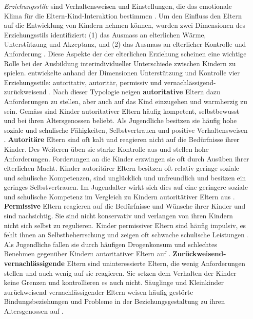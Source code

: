 \textit{Erziehungsstile} sind Verhaltensweisen und Einstellungen, die das emotionale Klima für die Eltern-Kind-Interaktion bestimmen \cite[S.~649]{Siegler2008}. Um den Einfluss den Eltern auf die Entwicklung von Kindern nehmen können, wurden zwei Dimensionen des Erziehungsstils identifiziert: (1) das Ausmass an elterlichen Wärme, Unterstützung und Akzeptanz, und (2) das Ausmass an elterlicher Kontrolle und Anforderung \cite{Maccoby1983}. Diese Aspekte der der elterlichen Erziehung scheinen eine wichtige Rolle bei der Ausbildung interindividueller Unterschiede zwischen Kindern zu spielen.  entwickelte anhand der Dimensionen Unterstützung und Kontrolle vier Erziehungsstile: autoritativ, autoritär, permissiv und vernachlässigend-zurückweisend \cite{Baumrind1991}. Nach dieser Typologie neigen \textbf{autoritative} Eltern dazu Anforderungen zu stellen, aber auch auf das Kind einzugehen und warmherzig zu sein. Gemäss  sind Kinder autoritativer Eltern häufig kompetent, selbstbewusst und bei ihren Altersgenossen beliebt. Als Jugendliche besitzen sie häufig hohe soziale und schulische Fähigkeiten, Selbstvertrauen und positive Verhaltensweisen \cite{Lamborn1991}. \textbf{Autoritäre} Eltern sind oft kalt und reagieren nicht auf die Bedürfnisse ihrer Kinder. Des Weiteren üben sie starke Kontrolle aus und stellen hohe Anforderungen. Forderungen an die Kinder erzwingen sie oft durch Ausüben ihrer elterlichen Macht. Kinder autoritärer Eltern besitzen oft relativ geringe soziale und schulische Kompetenzen, sind unglücklich und unfreundlich und besitzen ein geringes Selbstvertrauen. Im Jugendalter wirkt sich dies auf eine geringere soziale und schulische Kompetenz im Vergleich zu Kindern autoritätiver Eltern aus \cite{Baumrind1991, Lamborn1991}.  \textbf{Permissive} Eltern reagieren auf die Bedürfnisse und Wünsche ihrer Kinder und sind nachsichtig. Sie sind nicht konservativ und verlangen von ihren Kindern nicht sich selbst zu regulieren. Kinder permissiver Eltern sind häufig impulsiv, es fehlt ihnen an Selbstbeherrschung und zeigen oft schwache schulische Leistungen \cite{Baumrind1991}. Als Jugendliche fallen sie durch häufigen Drogenkonsum und schlechtes Benehmen gegenüber Kindern autoritativer Eltern auf \cite{Lamborn1991}. \textbf{Zurückweisend-vernachlässigende} Eltern sind uninteressierte Eltern, die wenig Anforderungen stellen und auch wenig auf sie reagieren. Sie setzen dem Verhalten der Kinder keine Grenzen und kontrollieren es auch nicht. Säuglinge und Kleinkinder zurückweisend-vernachlässigender Eltern weisen häufig gestörte Bindungsbeziehungen und Probleme in der Beziehungsgestaltung zu ihren Altersgenossen auf \cite{Parke1998}.


